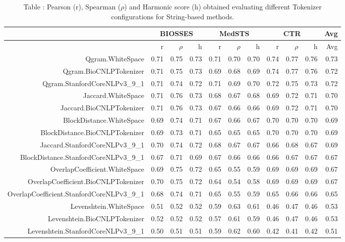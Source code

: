 \begin{table}[!h]
\centering
\caption{Table \label{table:Preprocessing_tokenizers_StringMethods}: Pearson (r), Spearman ($\rho$) and Harmonic score (h) obtained evaluating different Tokenizer configurations for String-based methods.} 
\begingroup\tiny
\begin{tabular}{rrrrrrrrrrr}
  \hline \multicolumn{1}{c}{ } & \multicolumn{3}{c}{BIOSSES} & \multicolumn{3}{c}{MedSTS} & \multicolumn{3}{c}{CTR} & \multicolumn{1}{c}{Avg} \\  \hline
 & r & $\rho$ & h & r & $\rho$ & h & r & $\rho$ & h & Avg \\ 
  \hline
Qgram.WhiteSpace & 0.71 & 0.75 & 0.73 & 0.71 & 0.70 & 0.70 & 0.74 & 0.77 & 0.76 & 0.73 \\ 
  Qgram.BioCNLPTokenizer & 0.71 & 0.75 & 0.73 & 0.69 & 0.68 & 0.69 & 0.74 & 0.77 & 0.76 & 0.72 \\ 
  Qgram.StanfordCoreNLPv3\_9\_1 & 0.71 & 0.74 & 0.72 & 0.71 & 0.69 & 0.70 & 0.72 & 0.75 & 0.73 & 0.72 \\ 
  Jaccard.WhiteSpace & 0.71 & 0.76 & 0.73 & 0.68 & 0.67 & 0.68 & 0.69 & 0.72 & 0.71 & 0.70 \\ 
  Jaccard.BioCNLPTokenizer & 0.71 & 0.76 & 0.73 & 0.67 & 0.66 & 0.66 & 0.69 & 0.72 & 0.71 & 0.70 \\ 
  BlockDistance.WhiteSpace & 0.69 & 0.74 & 0.71 & 0.67 & 0.66 & 0.67 & 0.70 & 0.70 & 0.70 & 0.69 \\ 
  BlockDistance.BioCNLPTokenizer & 0.69 & 0.73 & 0.71 & 0.65 & 0.65 & 0.65 & 0.70 & 0.70 & 0.70 & 0.69 \\ 
  Jaccard.StanfordCoreNLPv3\_9\_1 & 0.70 & 0.74 & 0.72 & 0.68 & 0.67 & 0.67 & 0.66 & 0.68 & 0.67 & 0.69 \\ 
  BlockDistance.StanfordCoreNLPv3\_9\_1 & 0.67 & 0.71 & 0.69 & 0.67 & 0.66 & 0.66 & 0.66 & 0.67 & 0.67 & 0.67 \\ 
  OverlapCoefficient.WhiteSpace & 0.69 & 0.75 & 0.72 & 0.65 & 0.55 & 0.59 & 0.69 & 0.69 & 0.69 & 0.67 \\ 
  OverlapCoefficient.BioCNLPTokenizer & 0.70 & 0.75 & 0.72 & 0.64 & 0.54 & 0.58 & 0.69 & 0.69 & 0.69 & 0.67 \\ 
  OverlapCoefficient.StanfordCoreNLPv3\_9\_1 & 0.68 & 0.74 & 0.71 & 0.65 & 0.55 & 0.59 & 0.65 & 0.66 & 0.66 & 0.65 \\ 
  Levenshtein.WhiteSpace & 0.51 & 0.52 & 0.52 & 0.59 & 0.63 & 0.61 & 0.46 & 0.47 & 0.46 & 0.53 \\ 
  Levenshtein.BioCNLPTokenizer & 0.52 & 0.52 & 0.52 & 0.57 & 0.61 & 0.59 & 0.46 & 0.47 & 0.46 & 0.53 \\ 
  Levenshtein.StanfordCoreNLPv3\_9\_1 & 0.50 & 0.51 & 0.51 & 0.59 & 0.62 & 0.60 & 0.42 & 0.41 & 0.42 & 0.51 \\ 
   \hline
\end{tabular}
\endgroup
\end{table}
